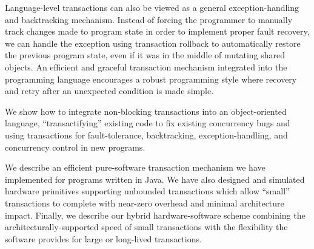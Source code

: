 \documentclass[twoside,twocolumn,notitlepage,letterpaper]{article}
\begin{document}
Language-level transactions can also be viewed as a general
exception-handling and backtracking mechanism.  Instead of forcing the
programmer to manually track changes made to program state in order to
implement proper fault recovery, we can handle the exception using
transaction rollback to automatically restore the previous program
state, even if it was in the middle of mutating shared objects.
An efficient and graceful transaction mechanism
integrated into the programming language encourages a robust
programming style where recovery and retry after an unexpected
condition is made simple.

We show how to integrate non-blocking transactions into an
object-oriented language, ``transactifying'' existing code to fix
existing concurrency bugs and using transactions for fault-tolerance,
backtracking, exception-handling, and concurrency control in new
programs.

We describe an efficient pure-software transaction mechanism we have
implemented for programs written in Java.  We have also designed and
simulated hardware primitives supporting unbounded transactions which
allow ``small'' transactions to complete with near-zero overhead and
minimal architecture impact.  Finally, we describe our hybrid
hardware-software scheme combining the architecturally-supported speed
of small transactions with the flexibility the software provides for
large or long-lived transactions.



\end{document}
